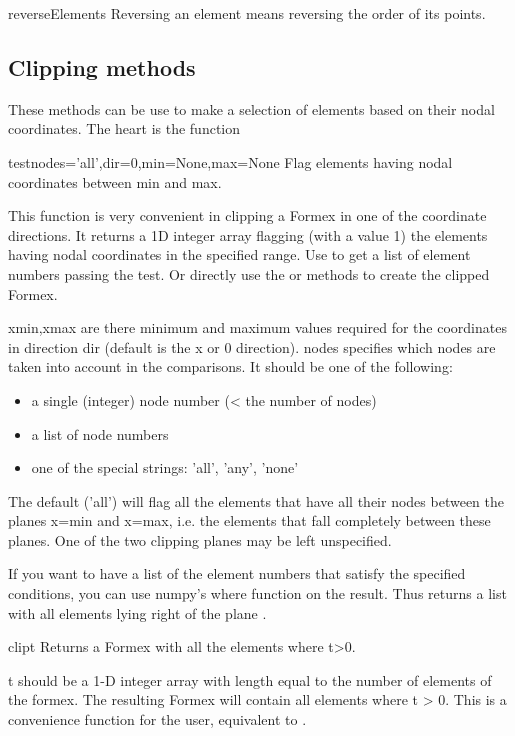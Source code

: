{{\begin{methoddesc}{reverseElements}{}
Reversing an element means reversing the order of its points.
\end{methoddesc}


\subsection{Clipping methods}
These methods can be use to make a selection of elements based on their nodal coordinates. The heart is the function
\begin{methoddesc}{test}{nodes='all',dir=0,min=None,max=None}
Flag elements having nodal coordinates between min and max.

This function is very convenient in clipping a Formex in one of
the coordinate directions. It returns a 1D integer array flagging
(with a value 1) the elements having nodal coordinates in the
specified range.
Use  to get a list of element numbers passing the test.
Or directly use the  or  methods to create the clipped Formex.

xmin,xmax are there minimum and maximum values required for the
coordinates in direction dir (default is the x or 0 direction).
nodes specifies which nodes are taken into account in the comparisons.
It should be one of the following:
\begin{itemize}
\item a single (integer) node number (< the number of nodes)
\item a list of node numbers
\item one of the special strings: 'all', 'any', 'none'
\end{itemize}
The default ('all') will flag all the elements that have all their
nodes between the planes x=min and x=max, i.e. the elements that
fall completely between these planes. One of the two clipping planes
may be left unspecified.
\end{methoddesc}

If you want to have a list of the element numbers that satisfy the specified conditions, you can use numpy's where function on the result. Thus  returns a list with all elements lying right of the plane .

\begin{methoddesc}{clip}{t}
Returns a Formex with all the elements where t>0.

t should be a 1-D integer array with length equal to the number
of elements of the formex.
The resulting Formex will contain all elements where t > 0.
This is a convenience function for the user, equivalent to
.
\end{methoddesc}

}}
